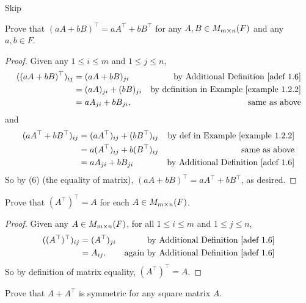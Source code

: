 \begin{exercise} \label{exercise 1.3.2}
Skip
\end{exercise}

\begin{exercise} \label{exercise 1.3.3}
Prove that \((aA + bB)^\top = aA^\top + bB^\top\) for any \(A, B \in M_{m \times n}(F)\) and any \(a, b \in F\).
\end{exercise}

\begin{proof}
Given any \(1 \le i \le m\) and \(1 \le j \le n\),
\begin{align*}
    ((aA + bB)^\top)_{ij} & = (aA + bB)_{ji} & \text{by \ADEF{1.6}} \\
                       & = (aA)_{ji} + (bB)_{ji} & \text{by definition in \EXAMPLE{1.2.2}} \\
                       & = aA_{ji} + bB_{ji}, & \text{same as above}
\end{align*}
and
\begin{align*}
    (aA^\top + bB^\top)_{ij} & = (aA^\top)_{ij} + (bB^\top)_{ij} & \text{by def in \EXAMPLE{1.2.2}} \\
                       & = a(A^\top)_{ij} + b(B^\top)_{ij} & \text{same as above} \\
                       & = aA_{ji} + bB_{ji} & \text{by \ADEF{1.6}}
\end{align*}
So by (6) (the equality of matrix), \((aA + bB)^\top = aA^\top + bB^\top\), as desired.
\end{proof}

\begin{exercise} \label{exercise 1.3.4}
Prove that \((A^\top)^\top = A\) for each \(A \in M_{m \times n}(F)\).
\end{exercise}

\begin{proof}
Given any \(A \in M_{m \times n}(F)\), for all \(1 \le i \le m\) and \(1 \le j \le n\),
\begin{align*}
    ((A^\top)^\top)_{ij} & = (A^\top)_{ji} & \text{by \ADEF{1.6}} \\
                   & = A_{ij}. & \text{again by \ADEF{1.6}}
\end{align*}
So by definition of matrix equality, \((A^\top)^\top = A\).
\end{proof}

\begin{exercise} \label{exercise 1.3.5}
Prove that \(A + A^\top\) is symmetric for any square matrix \(A\).
\end{exercise}

